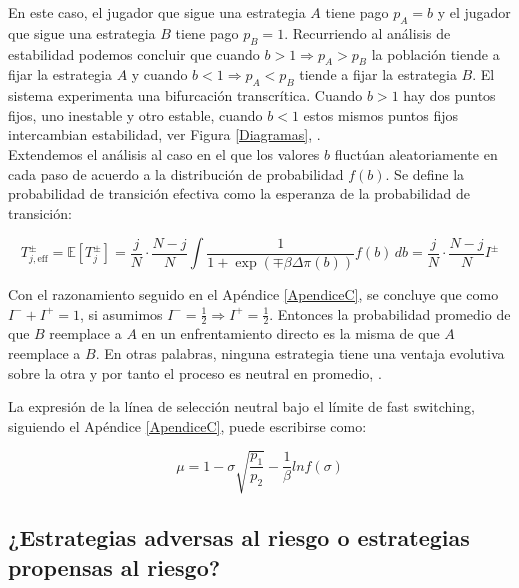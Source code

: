 \documentclass[%
 sor,
 jor,
 amsmath,amssymb,
 reprint,%
]{revtex4-2}
\begin{document}
En este caso, el jugador que sigue una estrategia $A$ tiene pago $p_A=b$ y el jugador que sigue una estrategia $B$ tiene pago $p_B=1$. Recurriendo al análisis de estabilidad podemos concluir que cuando $b>1 \Rightarrow p_A>p_B$ la población tiende a fijar la estrategia $A$ y cuando $b<1 \Rightarrow p_A<p_B$ tiende a fijar la estrategia $B$. El sistema experimenta una bifurcación transcrítica. Cuando $b>1$ hay dos puntos fijos, uno inestable y otro estable, cuando $b<1$ estos mismos puntos fijos intercambian estabilidad, ver Figura \ref{Diagramas}, \cite{CalvoTema2}.\\ 


Extendemos el análisis al caso en el que los valores \(b\) fluctúan aleatoriamente en cada paso de acuerdo a la distribución de probabilidad $f(b)$. Se define la probabilidad de transición efectiva como la esperanza de la probabilidad de transición:

\begin{equation}
T^{\pm}_{j,\mathrm{eff}} = \mathbb{E}[T^{\pm}_j] = \frac{j}{N} \cdot \frac{N - j}{N} \int \frac{1}{1 + \exp\left(\mp \beta \Delta \pi(b)\right)} f(b) \, db = \frac{j}{N} \cdot \frac{N - j}{N} I^{\pm}
\end{equation}

Con el razonamiento seguido en el Apéndice \ref{ApendiceC}, se concluye que como $I^-+I^+=1$, si asumimos $I^-=\frac{1}{2}$$ \Rightarrow I^+=\frac{1}{2}$. Entonces la probabilidad promedio de que $B$ reemplace a $A$ en un enfrentamiento directo es la misma de que $A$ reemplace a $B$. En otras palabras, ninguna estrategia tiene una ventaja evolutiva sobre la otra y por tanto el proceso es neutral en promedio, \cite{Ruben}.

La expresión de la línea de selección neutral bajo el límite de fast switching, siguiendo el Apéndice \ref{ApendiceC}, puede escribirse como:

\begin{equation}
    \mu = 1 -\sigma \sqrt{\frac{p_1}{p_2}} - \frac{1}{\beta}  ln f(\sigma)
\end{equation}

\subsection{¿Estrategias adversas al riesgo o estrategias propensas al riesgo?}
\end{document}
